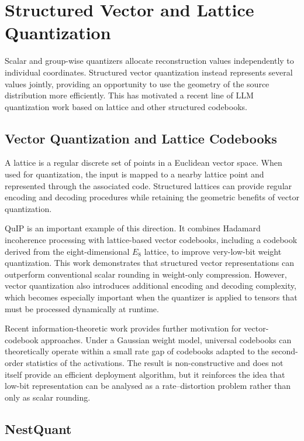\section{Structured Vector and Lattice Quantization}
Scalar and group-wise quantizers allocate reconstruction values
independently to individual coordinates. Structured vector quantization
instead represents several values jointly, providing an opportunity to
use the geometry of the source distribution more efficiently. This has
motivated a recent line of LLM quantization work based on lattice and
other structured codebooks.

\subsection{Vector Quantization and Lattice Codebooks}
A lattice is a regular discrete set of points in a Euclidean vector
space. When used for quantization, the input is mapped to a nearby
lattice point and represented through the associated code. Structured
lattices can provide regular encoding and decoding procedures while
retaining the geometric benefits of vector quantization\cite{chee2024quip2bitquantizationlarge}.

QuIP is an important example of this direction. It combines Hadamard
incoherence processing with lattice-based vector codebooks, including a
codebook derived from the eight-dimensional \(E_8\) lattice, to improve
very-low-bit weight quantization\cite{tseng2024quipbetterllmquantization}. This work demonstrates that structured vector
representations can outperform conventional scalar rounding in
weight-only compression. However, vector quantization also introduces
additional encoding and decoding complexity, which becomes especially
important when the quantizer is applied to tensors that must be processed
dynamically at runtime.

Recent information-theoretic work provides further motivation for
vector-codebook approaches. Under a Gaussian weight model, universal
codebooks can theoretically operate within a small rate gap of
codebooks adapted to the second-order statistics of the activations. The result is non-constructive and does
not itself provide an efficient deployment algorithm, but it reinforces
the idea that low-bit representation can be analysed as a
rate--distortion problem rather than only as scalar rounding\cite{harbuzova2026pricemetricuniversalityvector}.

\subsection{NestQuant}


